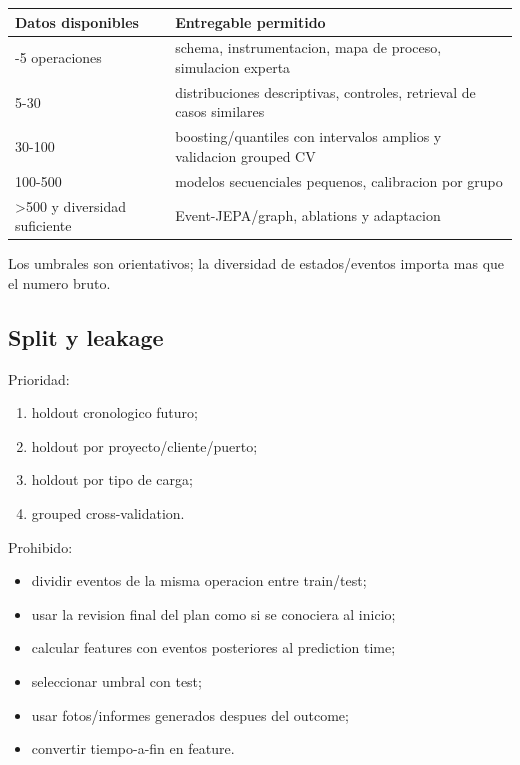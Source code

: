 \documentclass[
  spanish,
  10pt,
  a4paper,
]{article}
\newcounter{none} %
\providecommand{\tightlist}{%
  \setlength{\itemsep}{0pt}\setlength{\parskip}{0pt}}
\begin{document}
{\def\LTcaptype{none} %
\begin{longtable}[]{@{}ll@{}}
\toprule\noalign{}
Datos disponibles & Entregable permitido \\
\midrule\noalign{}
\endhead
\bottomrule\noalign{}
\endlastfoot
0-5 operaciones & schema, instrumentacion, mapa de proceso, simulacion
experta \\
5-30 & distribuciones descriptivas, controles, retrieval de casos
similares \\
30-100 & boosting/quantiles con intervalos amplios y validacion grouped
CV \\
100-500 & modelos secuenciales pequenos, calibracion por grupo \\
\textgreater500 y diversidad suficiente & Event-JEPA/graph, ablations y
adaptacion \\
\end{longtable}
}

Los umbrales son orientativos; la diversidad de estados/eventos importa
mas que el numero bruto.

\subsection{Split y leakage}\label{split-y-leakage}

Prioridad:

\begin{enumerate}
\def\labelenumi{\arabic{enumi}.}
\tightlist
\item
  holdout cronologico futuro;
\item
  holdout por proyecto/cliente/puerto;
\item
  holdout por tipo de carga;
\item
  grouped cross-validation.
\end{enumerate}

Prohibido:

\begin{itemize}
\tightlist
\item
  dividir eventos de la misma operacion entre train/test;
\item
  usar la revision final del plan como si se conociera al inicio;
\item
  calcular features con eventos posteriores al prediction time;
\item
  seleccionar umbral con test;
\item
  usar fotos/informes generados despues del outcome;
\item
  convertir tiempo-a-fin en feature.
\end{itemize}
\end{document}
